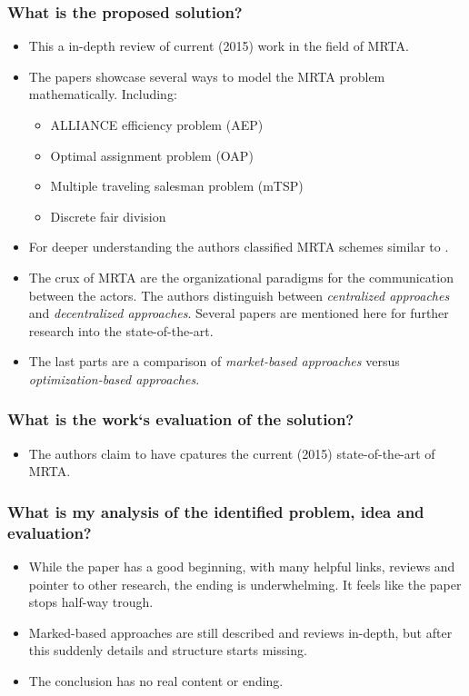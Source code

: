 \documentclass{article}
\begin{document}
\subsubsection*{What is the proposed solution?}
\begin{itemize}
    \item This a in-depth review of current (2015) work in the field of MRTA. 
    \item The papers showcase several ways to model the MRTA problem mathematically. Including: \begin{itemize}
        \item ALLIANCE efficiency problem (AEP)
        \item Optimal assignment problem (OAP)
        \item Multiple traveling salesman problem (mTSP)
        \item Discrete fair division
    \end{itemize}
    \item For deeper understanding the authors classified MRTA schemes similar to \cite{Gerkey2004}.
    \item The crux of MRTA are the organizational paradigms for the communication between the actors. The authors distinguish between \emph{centralized approaches} and \emph{decentralized approaches}. Several papers are mentioned here for further research into the state-of-the-art.
\item The last parts are a comparison of \emph{market-based approaches} versus \emph{optimization-based approaches}. 
\end{itemize}
\subsubsection*{What is the work`s evaluation of the solution?}
\begin{itemize}
    \item The authors claim to have cpatures the current (2015) state-of-the-art of MRTA.
\end{itemize}
\subsubsection*{What is my analysis of the identified problem, idea and evaluation?}
\begin{itemize}
    \item While the paper has a good beginning, with many helpful links, reviews and pointer to other research, the ending is underwhelming. It feels like the paper stops half-way trough. 
    \item Marked-based approaches are still described and reviews in-depth, but after this suddenly details and structure starts missing.
    \item The conclusion has no real content or ending.
\end{itemize}
\end{document}
